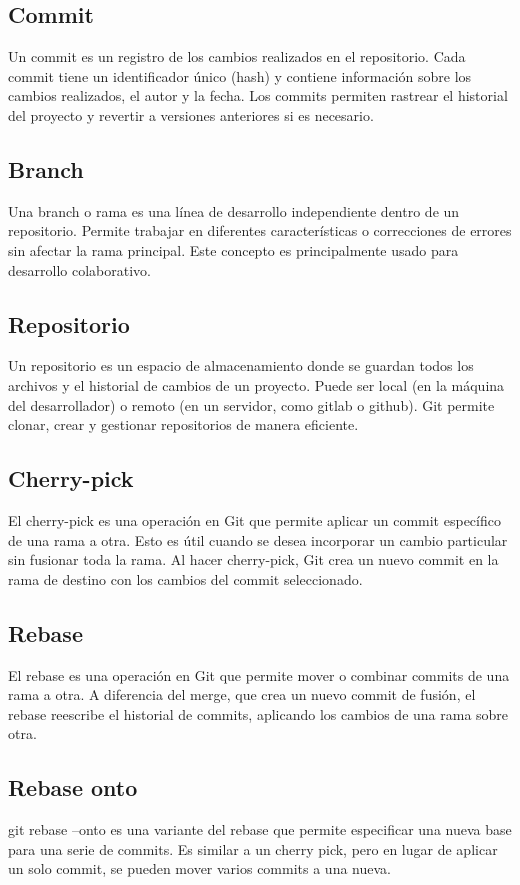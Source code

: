 \documentclass[12pt, letterpaper]{article}
\begin{document}
\subsection*{Commit}
Un commit es un registro de los cambios realizados en el repositorio. Cada commit tiene un identificador único (hash) y contiene información sobre los cambios realizados, el autor y la fecha. Los commits permiten rastrear el historial del proyecto y revertir a versiones anteriores si es necesario.

\subsection*{Branch}
Una branch o rama es una línea de desarrollo independiente dentro de un repositorio. Permite trabajar en diferentes características o correcciones de errores sin afectar la rama principal. Este concepto es principalmente usado para desarrollo colaborativo.

\subsection*{Repositorio}
Un repositorio es un espacio de almacenamiento donde se guardan todos los archivos y el historial de cambios de un proyecto. Puede ser local (en la máquina del desarrollador) o remoto (en un servidor, como gitlab o github). Git permite clonar, crear y gestionar repositorios de manera eficiente.

\subsection*{Cherry-pick}
El cherry-pick es una operación en Git que permite aplicar un commit específico de una rama a otra. Esto es útil cuando se desea incorporar un cambio particular sin fusionar toda la rama. Al hacer cherry-pick, Git crea un nuevo commit en la rama de destino con los cambios del commit seleccionado.

\subsection*{Rebase}
El rebase es una operación en Git que permite mover o combinar commits de una rama a otra. A diferencia del merge, que crea un nuevo commit de fusión, el rebase reescribe el historial de commits, aplicando los cambios de una rama sobre otra.

\subsection*{Rebase onto}
git rebase --onto es una variante del rebase que permite especificar una nueva base para una serie de commits. Es similar a un cherry pick, pero en lugar de aplicar un solo commit, se pueden mover varios commits a una nueva.
\end{document}
